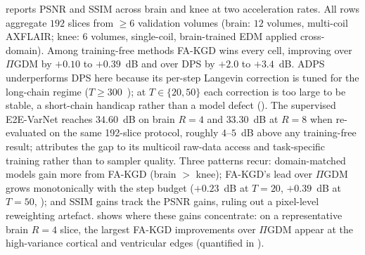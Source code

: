\documentclass[10pt,twocolumn,letterpaper]{article}
\begin{document}
 reports PSNR and SSIM across brain and knee at two
acceleration rates. All rows aggregate $192$ slices from $\geq 6$ validation
volumes (brain: $12$ volumes, multi-coil AXFLAIR; knee: $6$ volumes,
single-coil, brain-trained EDM applied cross-domain). Among training-free
methods FA-KGD wins every cell, improving over $\Pi$GDM by $+0.10$ to
$+0.39$~dB and over DPS by $+2.0$ to $+3.4$~dB. ADPS underperforms DPS here
because its per-step Langevin correction is tuned for the long-chain regime
($T\!\geq\!300$~\cite{daras2025ambient}); at $T\!\in\!\{20,50\}$ each
correction is too large to be stable, a short-chain handicap rather than a
model defect ().
The supervised E2E-VarNet reaches $34.60$~dB on brain $R{=}4$ and
$33.30$~dB at $R{=}8$ when re-evaluated on the same 192-slice protocol,
roughly $4$--$5$~dB above any training-free result; 
attributes the gap to its multicoil raw-data access and task-specific
training rather than to sampler quality. Three patterns recur:
domain-matched models gain more from FA-KGD (brain $>$ knee); FA-KGD's
lead over $\Pi$GDM grows monotonically with the step budget
($+0.23$~dB at $T{=}20$, $+0.39$~dB at $T{=}50$, );
and SSIM gains track the PSNR gains, ruling out a pixel-level
reweighting artefact.  shows where these gains concentrate:
on a representative brain $R{=}4$ slice, the largest FA-KGD improvements over
$\Pi$GDM appear at the high-variance cortical and ventricular edges
(quantified in ).
\end{document}
